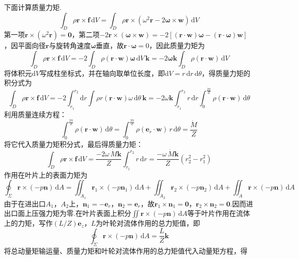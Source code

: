 下面计算质量力矩.
\[
\int_D \rho\boldsymbol{r}\times\boldsymbol{f}\,\mathrm{d}V=\int_D \rho\boldsymbol{r}\times(\omega^{2}\boldsymbol{r}-2\boldsymbol{\omega}\times\boldsymbol{w})\,\mathrm{d}V
\]
第一项$\boldsymbol{r}\times(\omega^{2}\boldsymbol{r})=\boldsymbol{0}$，第二项$-2\boldsymbol{r}\times(\boldsymbol{\omega}\times\boldsymbol{w})=-2[(\boldsymbol{r}\cdot\boldsymbol{w})\boldsymbol{\omega}-(\boldsymbol{r}\cdot\boldsymbol{\omega})\boldsymbol{w}]$，因平面向径$\boldsymbol{r}$与旋转角速度$\boldsymbol{\omega}$垂直，故$\boldsymbol{r}\cdot\boldsymbol{\omega}=0$，因此质量力矩为
\[
\int_D \rho\boldsymbol{r}\times\boldsymbol{f}\,\mathrm{d}V=-2\int_D \rho(\boldsymbol{r}\cdot\boldsymbol{w})\boldsymbol{\omega}\,\mathrm{d}V\,\boldsymbol{k}=-2\boldsymbol{\omega}\boldsymbol{k}\int_D \rho(\boldsymbol{r}\cdot\boldsymbol{w})\,\mathrm{d}V
\]
将体积元$\mathrm{d}V$写成柱坐标式，并在轴向取单位长度，即$\mathrm{d}V=r\,\mathrm{d}r\,\mathrm{d}\theta$，得质量力矩的积分式为
\[
\int_D \rho\boldsymbol{r}\times\boldsymbol{f}\,\mathrm{d}V=-2\int_{r_1}^{r_2}\mathrm{d}r\int \rho r(\boldsymbol{r}\cdot\boldsymbol{w})\omega\,\mathrm{d}\theta\,\boldsymbol{k}=-2\omega\boldsymbol{k}\int_{r_1}^{r_2}r\,\mathrm{d}r\int_0^{\frac{2\pi}{Z}} \rho(\boldsymbol{r}\cdot\boldsymbol{w})\,\mathrm{d}\theta
\]
利用质量连续方程：
\[
\int_0^{\frac{2\pi}{Z}} \rho(\boldsymbol{r}\cdot\boldsymbol{w})\,\mathrm{d}\theta=\int_0^{\frac{2\pi}{Z}} \rho(\boldsymbol{e}_r\cdot\boldsymbol{w})\,r\,\mathrm{d}\theta=\frac{\dot{M}}{Z}
\]
将它代入质量力矩积分式，最后得质量力矩：
\[
\int_D \rho\boldsymbol{r}\times\boldsymbol{f}\,\mathrm{d}V=\frac{-2\omega\,\dot{M}\boldsymbol{k}}{Z}\int_{r_1}^{r_2}r\,\mathrm{d}r=\frac{-\omega\,\dot{M}\boldsymbol{k}}{Z}(r_2^{2}-r_1^{2})
\]
作用在叶片上的表面力矩为
\[
\oint_\Sigma \boldsymbol{r}\times(-p\boldsymbol{n})\,\mathrm{d}A=\iint_{A_1}\boldsymbol{r}_1\times(-p\boldsymbol{n}_1)\,\mathrm{d}A+\iint_{A_2}\boldsymbol{r}_2\times(-p\boldsymbol{n}_2)\,\mathrm{d}A+\iint_{A}\boldsymbol{r}\times(-p\boldsymbol{n})\,\mathrm{d}A
\]
由于在进出口$A_1$，$A_2$上，$\boldsymbol{n}_1=-\boldsymbol{e}_r$，$\boldsymbol{n}_2=\boldsymbol{e}_r$，故$\boldsymbol{r}_1\times\boldsymbol{n}_1=\boldsymbol{0}$，$\boldsymbol{r}_2\times\boldsymbol{n}_2=\boldsymbol{0}$.因而进出口面上压强力矩为零.在叶片表面上积分$\displaystyle\iint \boldsymbol{r}\times(-p\boldsymbol{n})\,\mathrm{d}A$等于叶片作用在流体上的力矩，写作$(L/Z)\boldsymbol{e}_z$，$L$为叶轮对流体作用的总力矩值，即
\[
\oint_\Sigma \boldsymbol{r}\times(-p\boldsymbol{n})\,\mathrm{d}A=\frac{L}{Z}\boldsymbol{k}
\]
将总动量矩输运量、质量力矩和叶轮对流体作用的总力矩值代入动量矩方程，得

